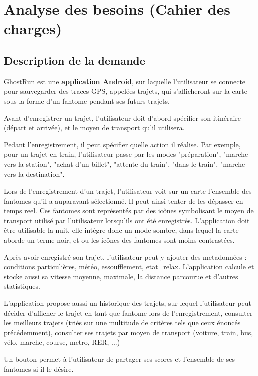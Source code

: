 \chapter{Analyse des besoins (Cahier des charges)}

\section{Description de la demande}

GhostRun est une \textbf{application Android}, sur laquelle l'utilisateur se connecte pour sauvegarder des traces GPS, appelées trajets, qui s'afficheront sur la carte sous la forme d'un \gls{fantome} pendant ses futurs trajets.

Avant d'enregistrer un trajet, l'utilisateur doit d'abord spécifier son itinéraire (départ et arrivée), et le moyen de transport qu'il utilisera. 

Pedant l'enregistrement, il peut spécifier quelle action il réalise. Par exemple, pour un trajet en train, l'utilisateur passe par les modes "préparation", "marche vers la station", "achat d'un billet", "attente du train", "dans le train", "marche vers la destination".

Lors de l'enregistrement d'un trajet, l'utilisateur voit sur un carte l'ensemble des \glspl{fantome} qu'il a auparavant sélectionné. Il peut ainsi tenter de les dépasser en temps reel. Ces \glspl{fantome} sont représentés par des icônes symbolisant le moyen de transport utilisé par l'utilisateur lorsqu'ils ont été enregistrés. L'application doit être utilisable la nuit, elle intègre donc un mode sombre, dans lequel la carte aborde un terme noir, et ou les icônes des \glspl{fantome} sont moins contrastées.

Après avoir enregistré son trajet, l'utilisateur peut y ajouter des metadonnées : conditions particulières, météo, essoufflement, \gls{etat_relax}. L'application calcule et stocke aussi sa vitesse moyenne, maximale, la distance parcourue et d'autres statistiques.

L'application propose aussi un historique des trajets, sur lequel l'utilisateur peut décider d'afficher le trajet en tant que \gls{fantome} lors de l'enregistrement, consulter les meilleurs trajets (triés sur une multitude de critères tels que ceux énoncés précédemment), consulter ses trajets par moyen de transport (voiture, train, bus, vélo, marche, course, metro, RER, ...)

Un bouton permet à l'utilisateur de partager ses scores et l'ensemble de ses \glspl{fantome} si il le désire.


